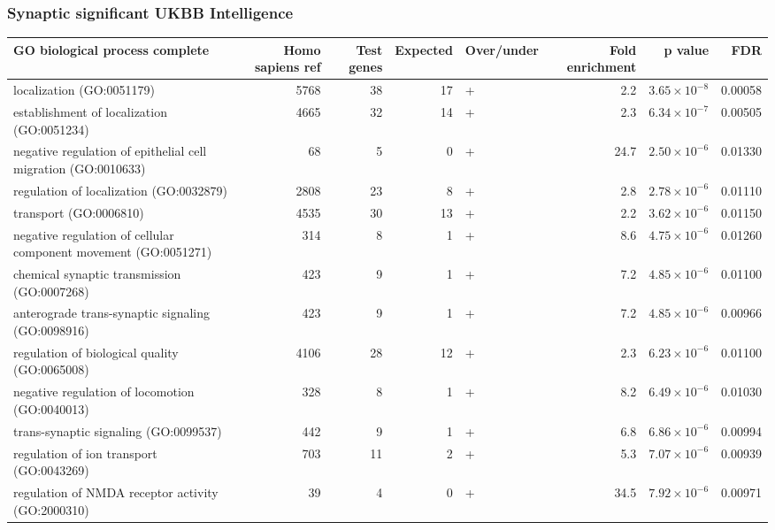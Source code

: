 \subsubsection{Synaptic significant UKBB Intelligence}
\begin{table}[ht]
\centering
\begin{adjustbox}{width=\textwidth}
\begin{tabular}{lrrrlrrr}
  \hline
GO biological process complete & Homo sapiens ref & Test genes & Expected & Over/under & Fold enrichment & p value & FDR \\ 
  \hline
localization (GO:0051179) & 5768 & 38 & 17 & + & 2.2 & $3.65 \times 10^{-8}$ & 0.00058 \\ 
  establishment of localization (GO:0051234) & 4665 & 32 & 14 & + & 2.3 & $6.34 \times 10^{-7}$ & 0.00505 \\ 
  negative regulation of epithelial cell migration (GO:0010633) & 68 & 5 & 0 & + & 24.7 & $2.50 \times 10^{-6}$ & 0.01330 \\ 
  regulation of localization (GO:0032879) & 2808 & 23 & 8 & + & 2.8 & $2.78 \times 10^{-6}$ & 0.01110 \\ 
  transport (GO:0006810) & 4535 & 30 & 13 & + & 2.2 & $3.62 \times 10^{-6}$ & 0.01150 \\ 
  negative regulation of cellular component movement (GO:0051271) & 314 & 8 & 1 & + & 8.6 & $4.75 \times 10^{-6}$ & 0.01260 \\ 
  chemical synaptic transmission (GO:0007268) & 423 & 9 & 1 & + & 7.2 & $4.85 \times 10^{-6}$ & 0.01100 \\ 
  anterograde trans-synaptic signaling (GO:0098916) & 423 & 9 & 1 & + & 7.2 & $4.85 \times 10^{-6}$ & 0.00966 \\ 
  regulation of biological quality (GO:0065008) & 4106 & 28 & 12 & + & 2.3 & $6.23 \times 10^{-6}$ & 0.01100 \\ 
  negative regulation of locomotion (GO:0040013) & 328 & 8 & 1 & + & 8.2 & $6.49 \times 10^{-6}$ & 0.01030 \\ 
  trans-synaptic signaling (GO:0099537) & 442 & 9 & 1 & + & 6.8 & $6.86 \times 10^{-6}$ & 0.00994 \\ 
  regulation of ion transport (GO:0043269) & 703 & 11 & 2 & + & 5.3 & $7.07 \times 10^{-6}$ & 0.00939 \\ 
  regulation of NMDA receptor activity (GO:2000310) & 39 & 4 & 0 & + & 34.5 & $7.92 \times 10^{-6}$ & 0.00971 \\ 

\end{tabular}
\end{adjustbox}
\end{table}
